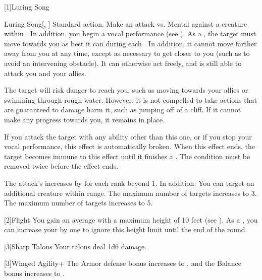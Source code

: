     [1]{Luring Song}
      \begin{magicalactiveability}{Luring Song}[, ]
        \abilityusagetime Standard action.
        \rankline
        Make an attack vs. Mental against a creature within \longrange.
        In addition, you begin a vocal performance (see ).
        \hit As a , the target must move towards you as best it can during each .
        In addition, it cannot move farther away from you at any time, except as necessary to get closer to you (such as to avoid an intervening obstacle).
        It can otherwise act freely, and is still able to attack you and your allies.

        The target will risk danger to reach you, such as moving towards your allies or swimming through rough water.
        However, it is not compelled to take actions that are guaranteed to damage harm it, such as jumping off of a cliff.
        If it cannot make any progress towards you, it remains in place.

        If you attack the target with any ability other than this one, or if you stop your vocal performance, this effect is automatically broken.
        When this effect ends, the target becomes immune to this effect until it finishes a .
        \crit The condition must be removed twice before the effect ends.

        \rankline
        The attack's  increases by  for each rank beyond 1.
        In addition:
         You can target an additional creature within range.
         The maximum number of targets increases to 3.
         The maximum number of targets increases to 5.
      \end{magicalactiveability}

    [2]{Flight} You gain an average  with a maximum height of 10 feet (see ).
      As a , you can increase your  by one to ignore this height limit until the end of the round.

    [3]{Sharp Talons} Your talons deal 1d6 damage.

    [3]{Winged Agility+} The Armor defense bonus increases to , and the Balance bonus increases to .

